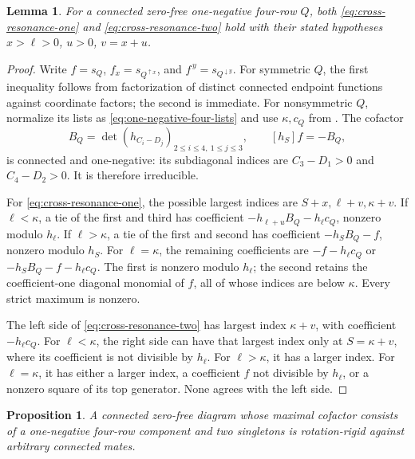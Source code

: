 \documentclass[11pt,a4paper]{amsart}
\numberwithin{equation}{section}
\theoremstyle{plain}
\newtheorem{proposition}[theorem]{Proposition}
\newtheorem{lemma}[theorem]{Lemma}
\theoremstyle{definition}
\begin{document}
\begin{lemma}\label{lem:one-negative-cross-resonance}
For a connected zero-free one-negative four-row \(Q\), both
\eqref{eq:cross-resonance-one} and \eqref{eq:cross-resonance-two} hold
with their stated hypotheses \(x>\ell>0\), \(u>0\), \(v=x+u\).
\end{lemma}

\begin{proof}
Write \(f=s_Q\), \(f_x=s_{Q^{\uparrow x}}\), and
\(f^{\,y}=s_{Q^{\downarrow y}}\).  For symmetric \(Q\), the first
inequality follows from factorization of distinct connected endpoint
functions against coordinate factors; the second is immediate.
For nonsymmetric \(Q\), normalize its lists as
\eqref{eq:one-negative-four-lists} and use \(\kappa,c_Q\) from
.  The cofactor
\[
 B_Q=\det(h_{C_i-D_j})_{2\le i\le4,\ 1\le j\le3},
 \qquad [h_S]f=-B_Q,
\]
is connected and one-negative: its subdiagonal indices are
\(C_3-D_1>0\) and \(C_4-D_2>0\).  It is therefore irreducible.

For \eqref{eq:cross-resonance-one}, the possible largest indices are
\(S+x,\ell+v,\kappa+v\).  If \(\ell<\kappa\), a tie of the first
and third has coefficient \(-h_{\ell+u}B_Q-h_\ell c_Q\), nonzero
modulo \(h_\ell\).  If \(\ell>\kappa\), a tie of the first and
second has coefficient \(-h_SB_Q-f\), nonzero modulo \(h_S\).
For \(\ell=\kappa\), the remaining coefficients are
\(-f-h_\ell c_Q\) or \(-h_SB_Q-f-h_\ell c_Q\).
The first is nonzero modulo \(h_\ell\); the second retains the
coefficient-one diagonal monomial of \(f\), all of whose indices are
below \(\kappa\).  Every strict maximum is nonzero.

The left side of \eqref{eq:cross-resonance-two} has largest index
\(\kappa+v\), with coefficient \(-h_\ell c_Q\).
For \(\ell<\kappa\), the right side can have that largest index only
at \(S=\kappa+v\), where its coefficient is not divisible by
\(h_\ell\).  For \(\ell>\kappa\), it has a larger index.
For \(\ell=\kappa\), it has either a larger index, a coefficient
\(f\) not divisible by \(h_\ell\), or a nonzero square of its top
generator.  None agrees with the left side.
\end{proof}

\begin{proposition}\label{prop:one-negative-three-component-rigidity}
A connected zero-free diagram whose maximal cofactor consists of a
one-negative four-row component and two singletons is rotation-rigid
against arbitrary connected mates.
\end{proposition}
\end{document}
